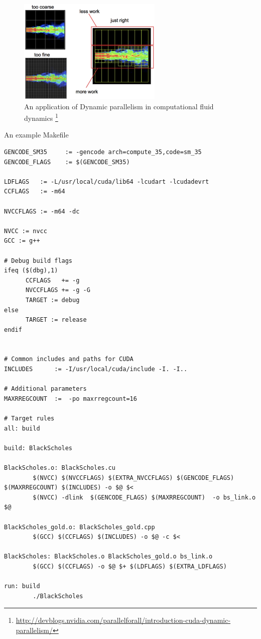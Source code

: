\begin{figure}[hbt]
  \centerline{\includegraphics[height=5cm,
    angle=0]{./images/dynamic-parallelism-fluid-dynamics.eps}}
  \caption{An application of Dynamic parallelism in computational fluid
  dynamics
  \footnote{\url{http://devblogs.nvidia.com/parallelforall/introduction-cuda-dynamic-parallelism/}}}
\label{fig:dynamic-parallelism-fluid-dynamics}
\end{figure}

An example Makefile
\begin{verbatim}
GENCODE_SM35     := -gencode arch=compute_35,code=sm_35
GENCODE_FLAGS    := $(GENCODE_SM35)

LDFLAGS   := -L/usr/local/cuda/lib64 -lcudart -lcudadevrt
CCFLAGS   := -m64

NVCCFLAGS := -m64 -dc

NVCC := nvcc
GCC := g++

# Debug build flags
ifeq ($(dbg),1)
      CCFLAGS   += -g
      NVCCFLAGS += -g -G
      TARGET := debug
else
      TARGET := release
endif


# Common includes and paths for CUDA
INCLUDES      := -I/usr/local/cuda/include -I. -I..

# Additional parameters
MAXRREGCOUNT  :=  -po maxrregcount=16

# Target rules
all: build

build: BlackScholes

BlackScholes.o: BlackScholes.cu
        $(NVCC) $(NVCCFLAGS) $(EXTRA_NVCCFLAGS) $(GENCODE_FLAGS) $(MAXRREGCOUNT) $(INCLUDES) -o $@ $<
        $(NVCC) -dlink  $(GENCODE_FLAGS) $(MAXRREGCOUNT)  -o bs_link.o $@

BlackScholes_gold.o: BlackScholes_gold.cpp
        $(GCC) $(CCFLAGS) $(INCLUDES) -o $@ -c $<

BlackScholes: BlackScholes.o BlackScholes_gold.o bs_link.o
        $(GCC) $(CCFLAGS) -o $@ $+ $(LDFLAGS) $(EXTRA_LDFLAGS)

run: build
        ./BlackScholes
\end{verbatim}

